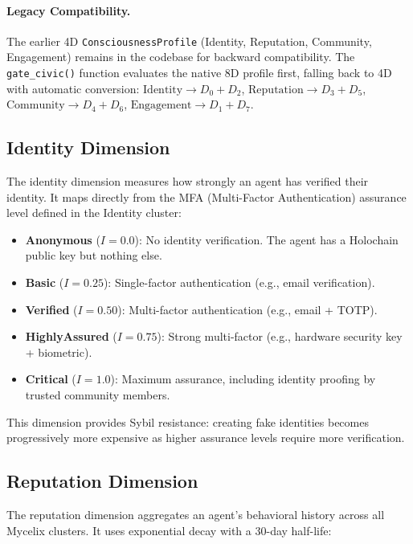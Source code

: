 \documentclass[12pt]{book}
\begin{document}
\paragraph{Legacy Compatibility.} The earlier 4D \texttt{ConsciousnessProfile} (Identity, Reputation, Community, Engagement) remains in the codebase for backward compatibility. The \texttt{gate\_civic()} function evaluates the native 8D profile first, falling back to 4D with automatic conversion:
$\text{Identity} \to D_0 + D_2$, $\text{Reputation} \to D_3 + D_5$, $\text{Community} \to D_4 + D_6$, $\text{Engagement} \to D_1 + D_7$.

\subsection{Identity Dimension}

The identity dimension measures how strongly an agent has verified their identity.
It maps directly from the MFA (Multi-Factor Authentication) assurance level
defined in the Identity cluster:

\begin{itemize}
  \item \textbf{Anonymous} ($I = 0.0$): No identity verification. The agent has
    a Holochain public key but nothing else.
  \item \textbf{Basic} ($I = 0.25$): Single-factor authentication (e.g., email
    verification).
  \item \textbf{Verified} ($I = 0.50$): Multi-factor authentication (e.g.,
    email + TOTP).
  \item \textbf{HighlyAssured} ($I = 0.75$): Strong multi-factor (e.g.,
    hardware security key + biometric).
  \item \textbf{Critical} ($I = 1.0$): Maximum assurance, including identity
    proofing by trusted community members.
\end{itemize}

This dimension provides Sybil resistance: creating fake identities becomes
progressively more expensive as higher assurance levels require more verification.

\subsection{Reputation Dimension}

The reputation dimension aggregates an agent's behavioral history across all
Mycelix clusters. It uses exponential decay with a 30-day half-life:
\end{document}
